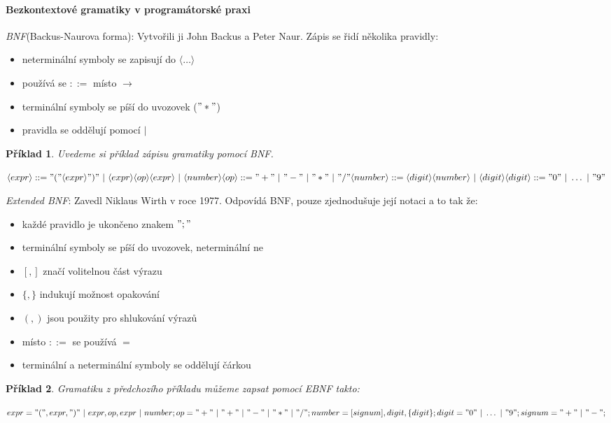 \documentclass[10pt,a4paper]{article}
\theoremstyle{note}
\newtheorem{priklad}{Příklad}
\begin{document}
\paragraph{Bezkontextové gramatiky v programátorské praxi}

\textit{BNF}(Backus-Naurova forma):
Vytvořili ji John Backus a Peter Naur. Zápis se řidí několika pravidly:
\begin{itemize}
\item
neterminální symboly se zapisují do $\langle \ldots \rangle$
\item
používá se $::=$ místo $\rightarrow$
\item
terminální symboly se píší do uvozovek ($"*"$)
\item
pravidla se oddělují pomocí $|$
\end{itemize}

\begin{priklad}
Uvedeme si příklad zápisu gramatiky pomocí BNF.

$\langle expr \rangle ::= "(" \langle expr \rangle ")"\ |\ \langle expr \rangle\langle op \rangle\langle expr \rangle\ |\ \langle number \rangle \\
\langle op \rangle ::= "+"\ |\ "-"\ |\ "*"\ |\ "/" \\
\langle number \rangle ::= \langle digit \rangle \langle number \rangle\ |\ \langle digit \rangle \\
\langle digit \rangle ::= "0"\ |\ \ldots\ |\ "9"$
\end{priklad}

\textit{Extended BNF}: Zavedl Niklaus Wirth v roce 1977. Odpovídá BNF, pouze zjednodušuje její notaci a to tak že:
\begin{itemize}
\item
každé pravidlo je ukončeno znakem $";"$
\item
terminální symboly se píší do uvozovek, neterminální ne
\item
$[,]$ značí volitelnou část výrazu
\item
$\lbrace,\rbrace$ indukují možnost opakování
\item
$(,)$ jsou použity pro shlukování výrazů
\item
místo $::=$ se používá $=$
\item
terminální a neterminální symboly se oddělují čárkou
\end{itemize}

\begin{priklad}
Gramatiku z předchozího příkladu můžeme zapsat pomocí EBNF takto:

$expr="(",expr,")"\ |\ expr,op,expr\ |\ number;\\
op="+"\ |\ "+"\ |\ "-"\ |\ "*"\ |\ "/";\\
number=[signum],digit,\lbrace digit \rbrace;\\
digit="0"\ |\ \ldots \ |\ "9";\\
signum="+"\ |\ "-";$
\end{priklad}
\end{document}
